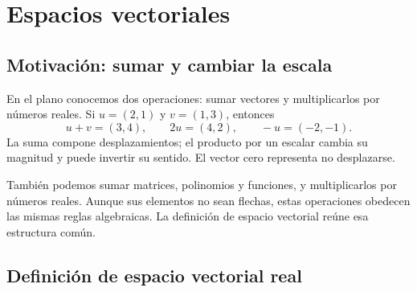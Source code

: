 \documentclass[compacto,10pt]{pubciencias-notas}
\begin{document}
\encabezado
\vspace*{-8mm}
\setcounter{section}{3}
\section{Espacios vectoriales}
\subsection{Motivación: sumar y cambiar la escala}

En el plano conocemos dos operaciones: sumar vectores y multiplicarlos por
números reales. Si $u=(2,1)$ y $v=(1,3)$, entonces
\[
    u+v=(3,4),\qquad 2u=(4,2),\qquad -u=(-2,-1).
\]
La suma compone desplazamientos; el producto por un escalar cambia su
magnitud y puede invertir su sentido. El vector cero representa no desplazarse.

\begin{center}
\end{center}

También podemos sumar matrices, polinomios y funciones, y multiplicarlos
por números reales. Aunque sus elementos no sean flechas, estas operaciones
obedecen las mismas reglas algebraicas. La definición de espacio vectorial
reúne esa estructura común.

\subsection{Definición de espacio vectorial real}
\end{document}
